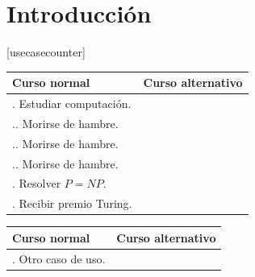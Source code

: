 \documentclass[a4paper, 10pt, twoside]{article}
\begin{document}
\newpage




\tableofcontents

\newpage




\section{Introducción}


[usecasecounter]

\newenvironment{usecase}
  {
    \begin{tabular}{|l|l|}
    \hline
    Curso normal & Curso alternativo \\
    \hline
    \hline
    \setcounter{usecasecounter}{0}
  }{
    \end{tabular}
  }

\newcommand\ucitem[2]{
	\stepcounter{usecasecounter}
	\arabic{usecasecounter}. #1 & \pbox{5cm}{#2} \\
	\hline
}

\newcommand\ucalt[1]{\stepcounter{usecasealtcounter}\arabic{usecasecounter}.\arabic{usecasealtcounter}. #1}




\begin{usecase}
  \ucitem{Estudiar computación.}
         {\ucalt{Dedicarse a bellas artes.} \\
          \ucalt{Morirse de hambre.} \\
          \ucalt{Morirse de hambre.} \\
          \ucalt{Morirse de hambre.}}
  \ucitem{Resolver $P=NP$.}
         {\ucalt{Trabajar en otro problema.}}
  \ucitem{Recibir premio Turing.}{}
\end{usecase}

\vspace{5cm}

\begin{usecase}
  \ucitem{Otro caso de uso.}
         {\ucalt{Otro curso alternativo.}}
\end{usecase}
\end{document}
